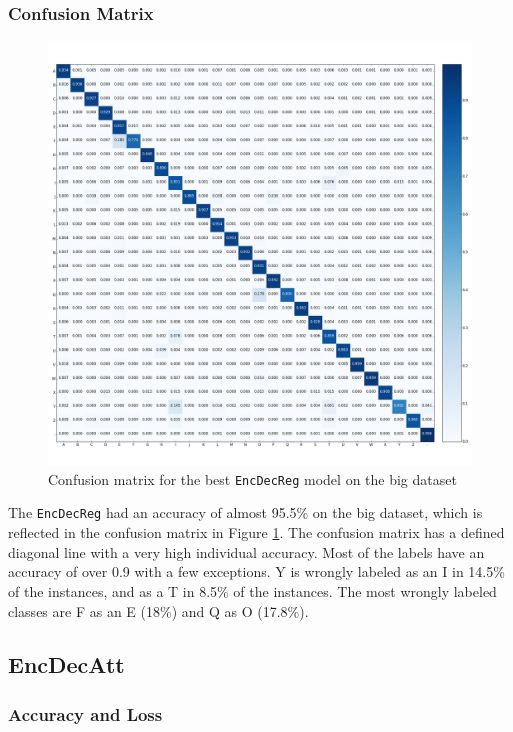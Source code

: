 \subsubsection{Confusion Matrix}
\begin{figure}[H]
    \centering
    \includegraphics[width=1\textwidth]{fig/results/experiment1/big/encdecreg/confusion_matrix.png}
    \caption{Confusion matrix for the best {\tt EncDecReg} model on the big dataset}
    \label{fig:result1_big_encdecreg_confusion_matrix}
\end{figure}

The {\tt EncDecReg} had an accuracy of almost 95.5\% on the big dataset, which is reflected in the confusion matrix in Figure \ref{fig:result1_big_encdecreg_confusion_matrix}. The confusion matrix has a defined diagonal line with a very high individual accuracy. Most of the labels have an accuracy of over 0.9 with a few exceptions. Y is wrongly labeled as an I in 14.5\% of the instances, and as a T in 8.5\% of the instances. The most wrongly labeled classes are F as an E (18\%) and Q as O (17.8\%).

\newpage
\subsection{EncDecAtt}
\subsubsection{Accuracy and Loss}
\newpage
{}

